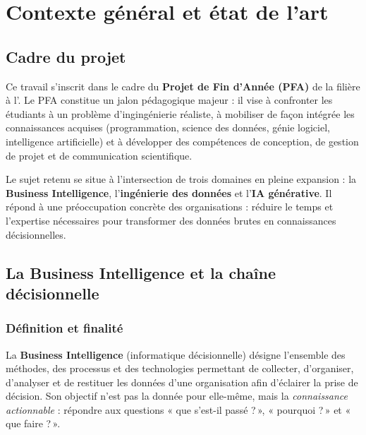 \chapter{Contexte général et état de l'art}
\label{chap:contexte}


\section{Cadre du projet}
Ce travail s'inscrit dans le cadre du \textbf{Projet de Fin d'Année (PFA)} de
la filière \textit{\mafiliere} à l'\textbf{\monetablissement}. Le PFA constitue
un jalon pédagogique majeur : il vise à confronter les étudiants à un problème
d'ingingénierie réaliste, à mobiliser de façon intégrée les connaissances
acquises (programmation, science des données, génie logiciel, intelligence
artificielle) et à développer des compétences de conception, de gestion de
projet et de communication scientifique.

Le sujet retenu se situe à l'intersection de trois domaines en pleine
expansion : la \textbf{Business Intelligence}, l'\textbf{ingénierie des données}
et l'\textbf{IA générative}. Il répond à une préoccupation concrète des
organisations : réduire le temps et l'expertise nécessaires pour transformer
des données brutes en connaissances décisionnelles.

\section{La Business Intelligence et la chaîne décisionnelle}

\subsection{Définition et finalité}
La \textbf{Business Intelligence} (informatique décisionnelle) désigne
l'ensemble des méthodes, des processus et des technologies permettant de
collecter, d'organiser, d'analyser et de restituer les données d'une
organisation afin d'éclairer la prise de décision. Son objectif n'est pas la
donnée pour elle-même, mais la \emph{connaissance actionnable} : répondre aux
questions « que s'est-il passé ?\,», « pourquoi ?\,» et « que faire ?\,».

